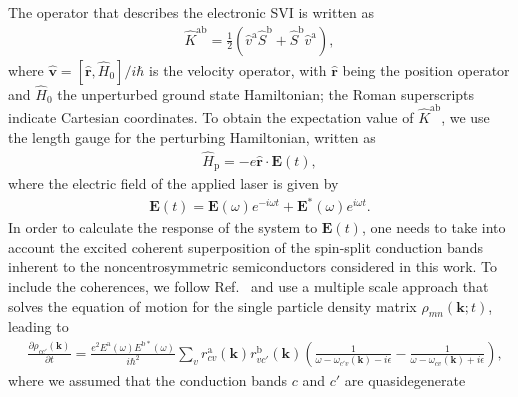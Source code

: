 \documentclass[floatfix,prb,aps,superscriptaddress,showpacs,11pt,preprint,letterpaper]{revtex4}
\begin{document}
The operator that describes the electronic SVI is written as
\begin{align}\label{z.1}
\hat K^{\mathrm{a}\mathrm{b}} = 
\frac{1}{2}\left( \hat v^\mathrm{a} \hat S^\mathrm{b} 
+\hat  S^\mathrm{b} \hat v^\mathrm{a}\right) 
,
\end{align} 
where $\hat{\mathbf v}=[\hat{\mathbf r},\hat H_0]/i\hbar$ is the velocity
operator, with $\hat {\mathbf r}$ being the position operator and $\hat H_0$ the
unperturbed ground state Hamiltonian; the Roman superscripts  indicate Cartesian
coordinates. To obtain the expectation value of $\hat K^{\mathrm{a}\mathrm{b}}$,
we use the length gauge for the perturbing Hamiltonian, written as
\begin{align}\label{z.2}
\hat H_{\text{p}}=-e\hat{\mathbf r}\cdot{\mathbf E}(t)
,
\end{align}   
where the electric field of the applied laser is given by
\begin{align}\label{z.3}
{\mathbf E}(t) = 
{\mathbf E}(\omega)e^{-i\omega t} + {\mathbf E}^*(\omega)e^{i\omega t}
.
\end{align}
In order to calculate the response of the system to ${\mathbf E}(t)$, one needs
to take into account the excited coherent superposition of the spin-split
conduction bands inherent to the noncentrosymmetric semiconductors considered in
this work.
To include the coherences, we follow Ref.~ and use a
multiple scale approach that solves the equation of motion for the single
particle density matrix ${\rho}_{mn}({\mathbf k};t)$, leading to
\begin{align}\label{z.4}
&\frac{\partial \rho_{cc'}({\mathbf k})}{\partial t} =
\frac{e^{2}E^{\mathrm{a}}(\omega)E^{\mathrm{b*}}(\omega)}{i \hbar^{2}}
\sum_{v}r^{\mathrm{a}}_{cv}({\mathbf k}) r^{\mathrm{b}}_{vc'}({\mathbf k})
\left( \frac{1}{\omega - \omega_{c'v}({\mathbf k}) - i \epsilon} - 
\frac{1}{\omega - \omega_{cv}({\mathbf k}) + i \epsilon} \right)
,
\end{align}
where we assumed that the conduction bands $c$ and $c'$ are quasidegenerate
\end{document}
